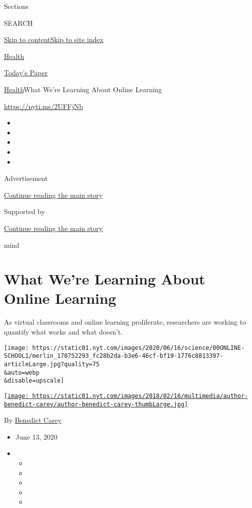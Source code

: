 Sections

SEARCH

\protect\hyperlink{site-content}{Skip to
content}\protect\hyperlink{site-index}{Skip to site index}

\href{https://www.nytimes.com/section/health}{Health}

\href{https://myaccount.nytimes.com/auth/login?response_type=cookie\&client_id=vi}{}

\href{https://www.nytimes.com/section/todayspaper}{Today's Paper}

\href{/section/health}{Health}\textbar{}What We're Learning About Online
Learning

\url{https://nyti.ms/2UFFjNb}

\begin{itemize}
\item
\item
\item
\item
\item
\end{itemize}

Advertisement

\protect\hyperlink{after-top}{Continue reading the main story}

Supported by

\protect\hyperlink{after-sponsor}{Continue reading the main story}

mind

\hypertarget{what-were-learning-about-online-learning}{%
\section{What We're Learning About Online
Learning}\label{what-were-learning-about-online-learning}}

As virtual classrooms and online learning proliferate, researchers are
working to quantify what works and what doesn't.

\texttt{[image: https://static01.nyt.com/images/2020/06/16/science/00ONLINE-SCHOOL1/merlin\_170752293\_fc28b2da-b3e6-46cf-bf19-1776c8813397-articleLarge.jpg?quality=75\\\&auto=webp\\\&disable=upscale]}

\href{https://www.nytimes.com/by/benedict-carey}{\texttt{[image: https://static01.nyt.com/images/2018/02/16/multimedia/author-benedict-carey/author-benedict-carey-thumbLarge.jpg]}}

By \href{https://www.nytimes.com/by/benedict-carey}{Benedict Carey}

\begin{itemize}
\item
  June 13, 2020
\item
  \begin{itemize}
  \item
  \item
  \item
  \item
  \item
  \end{itemize}
\end{itemize}


